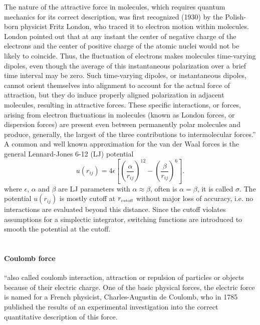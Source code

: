 \documentclass[11pt]{report}
\begin{document}
\begin{appendix}
The nature of the attractive force in molecules, which
requires quantum mechanics for its correct description, was
first recognized (1930) by the Polish-born physicist Fritz
London, who traced it to electron motion within molecules.
London pointed out that at any instant the center of negative
charge of the electrons and the center of positive charge of
the atomic nuclei would not be likely to coincide. Thus, the
fluctuation of electrons makes molecules time-varying
dipoles, even though the average of this instantaneous
polarization over a brief time interval may be zero. Such
time-varying dipoles, or instantaneous dipoles, cannot orient
themselves into alignment to account for the actual force of
attraction, but they do induce properly aligned polarization
in adjacent molecules, resulting in attractive forces. These
specific interactions, or forces, arising from electron
fluctuations in molecules (known as London forces, or
dispersion forces) are present even between permanently polar
molecules and produce, generally, the largest of the three
contributions to intermolecular forces.'' \\

A common and well known approximation for the van der Waal forces is the
general Lennard-Jones 6-12 (LJ) potential
\begin{equation}
      u(r_{ij}) =
          4\epsilon\left[\left(\frac{\alpha}{r_{ij}}\right)^{12} -
            \left(\frac{\beta}{r_{ij}}\right)^{6}\right]
    \label{eq:lennardjones}.
\end{equation}
where $\epsilon$, $\alpha$ and $\beta$ are LJ parameters with $\alpha
\approx \beta$, often is $\alpha = \beta$, it is called $\sigma$. The
potential $u(r_{ij})$ is mostly cutoff at $r_{\mbox{\tiny cutoff}}$
without major loss of accuracy, i.e. no
interactions are evaluated beyond this distance. Since the cutoff
violates assumptions for a simplectic integrator, switching functions
are introduced to smooth the potential at the cutoff. \\ \\
                                         

\paragraph{Coulomb force~\cite{EnBr00}}

 ``also called coulomb interaction, attraction or repulsion of
 particles or objects because of their electric charge. One of
 the basic physical forces, the electric force is named for a
 French physicist, Charles-Augustin de Coulomb, who in 1785
 published the results of an experimental investigation into
 the correct quantitative description of this force.\\


\end{appendix}
\end{document}
